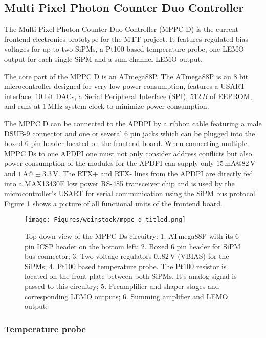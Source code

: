 \documentclass[]{article}
\begin{document}
\subsection{Multi Pixel Photon Counter Duo Controller}

The Multi Pixel Photon Counter Duo Controller (MPPC D) is the current frontend electronics prototype for the MTT project. It features regulated bias voltages for up to two SiPMs, 
a Pt100 based temperature probe, one LEMO output for each single SiPM and a sum channel LEMO output.

The core part of the MPPC D is an ATmega88P. The ATmega88P is an 8 bit microcontroller designed for very low power consumption, features a 
USART interface, 10 bit DACs, a Serial Peripheral Interface (SPI), $512\,B$ of EEPROM, and runs at $1\,\text{MHz}$ system clock to minimize power consumption. 

The MPPC D can be connected to the APDPI by a ribbon cable featuring a male DSUB-9 connector and one or several 6 pin jacks which can be plugged into the boxed 6 pin header located on the frontend board. When connecting multiple MPPC Ds to one APDPI one must not only consider address conflicts but also power consumption of the modules for the APDPI can supply only $15\,\text{mA}@82\,\text{V}$ and $1\,\text{A}@\pm3.3\,\text{V}$. The RTX+ and RTX- lines from the APDPI are directly fed into a MAX13430E low power RS-485  transceiver chip and is used by the microcontroller's USART for serial communication using the SiPM bus protocol. Figure \ref{mppc_top} shows a picture of all functional units of the frontend board.
	
	\begin{figure}[t]
		\centering
			\texttt{[image: Figures/weinstock/mppc\_d\_titled.png]}
		\caption{Top down view of the MPPC Ds circuitry: 1. ATmega88P with its 6 pin ICSP header on the bottom left; 
								  2. Boxed 6 pin header for SiPM bus connector;
								  3. Two voltage regulators $0..82\,\text{V}$ (VBIAS) for the SiPMs;
								  4. Pt100 based temperature probe. The Pt100 resistor is located on the front plate between both SiPMs. 
								       It's analog signal is passed to this circuitry;
								  5. Preamplifier and shaper stages and corresponding LEMO outputs; 
								  6. Summing amplifier and LEMO output;
			}
		\label{mppc_top}
	\end{figure}	

\newpage

\subsubsection{Temperature probe}
\end{document}
